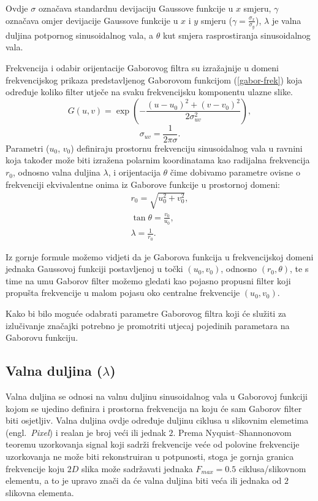 \documentclass{article}
\newcommand{\engl}[1]{(engl.~\emph{#1})}
\begin{document}
Ovdje $\sigma$ označava standardnu devijaciju Gaussove funkcije u $x$ smjeru,
$\gamma$ označava omjer devijacije Gaussove funkcije u $x$ i $y$ smjeru ($\gamma =
\frac{\sigma_x}{\sigma_y}$), $\lambda$ je valna duljina potpornog sinusoidalnog
vala, a $\theta$ kut smjera rasprostiranja sinusoidalnog vala.

Frekvencija i odabir orijentacije Gaborovog filtra su izražajnije u
domeni frekvencijskog prikaza predstavljenog Gaborovom funkcijom (\ref{gabor-frek}) koja
određuje koliko filter utječe na svaku frekvencijsku komponentu ulazne slike.
\begin{equation}
G(u,v) = \exp \left ( - \frac{(u-u_0)^2 + (v-v_0)^2}{2\sigma^2_{uv}}\right ),
\label{gabor-frek}
\end{equation}
\begin{equation}
\sigma_{uv} = \frac{1}{2\pi \sigma}.
\end{equation}
Parametri ($u_0$, $v_0$) definiraju prostornu frekvenciju sinusoidalnog vala u
ravnini koja također može biti izražena polarnim koordinatama kao radijalna
frekvencija $r_0$, odnosno valna duljina $\lambda$, i orijentacija $\theta$ čime
dobivamo parametre ovisne o frekvenciji ekvivalentne onima iz Gaborove funkcije u prostornoj
domeni:
\begin{eqnarray}
r_0 = \sqrt{u_0^2 + v_0^2}, \\
\tan \theta = \frac{v_0}{u_0}, \\
\lambda = \frac{1}{r_0}.
\end{eqnarray}

Iz gornje formule možemo vidjeti da je Gaborova funkcija u frekvencijskoj domeni
jednaka Gaussovoj funkciji postavljenoj u točki $(u_0, v_0)$, odnosno $(r_0,
\theta)$, te s time na umu Gaborov filter možemo gledati kao pojasno propusni
filter koji propušta frekvencije u malom pojasu oko centralne frekvencije $(u_0,
v_0)$.

Kako bi bilo moguće odabrati parametre Gaborovog filtra koji će služiti
za izlučivanje značajki potrebno je promotriti utjecaj pojedinih parametara na
Gaborovu funkciju.

\subsection{Valna duljina ($\lambda$)}
Valna duljina se odnosi na valnu duljinu sinusoidalnog vala u Gaborovoj funkciji
kojom se ujedino definira i prostorna frekvencija na koju će sam Gaborov filter
biti osjetljiv. Valna duljina ovdje određuje duljinu ciklusa u slikovnim
elemetima \engl{Pixel} i realan je broj veći ili jednak $2$. Prema
Nyquist--Shannonovom teoremu uzorkovanja signal koji sadrži frekvencije veće od
polovine frekvencije uzorkovanja ne može biti rekonstruiran u potpunosti, stoga
je gornja granica frekvencije koju $2D$ slika može sadržavati jednaka $F_{max} =
0.5$ ciklusa/slikovnom elementu, a to je upravo znači da će valna duljina
biti veća ili jednaka od $2$ slikovna elementa.
\end{document}
